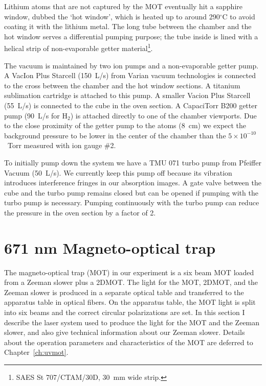 \documentclass[oneside,12pt]{memoir}
\begin{document}
Lithium atoms that are not captured by the MOT eventually hit a sapphire
window, dubbed the `hot window', which is heated up to around 290$^{\circ}$C
to avoid coating it with the lithium metal.  The long tube between the chamber
and the hot window serves a differential pumping purpose;  the tube inside is
lined with a helical strip of non-evaporable getter material\footnote{SAES St
707/CTAM/30D, 30~mm wide strip.}.

The vacuum is maintained by two ion pumps and a non-evaporable getter pump.  A
VacIon Plus Starcell (150~L/s) from Varian vacuum technologies is connected to
the cross between the chamber and the hot window sections.   A titanium
sublimation cartridge is attached to this pump.  A smaller Vacion Plus Starcell
(55~L/s) is connected to the cube in the oven section.  A CapaciTorr B200
getter pump (90~L/s for H$_{2}$) is attached directly to one of the chamber
viewports.   Due to the close proximity of the getter pump to the atoms (8~cm)
we expect the background pressure to be lower in the center of the chamber than
the $5\times10^{-10}$~Torr measured with ion gauge \#2.

To initially pump down the system we have a TMU 071 turbo pump from Pfeiffer
Vacuum (50~L/s).  We currently keep this pump off because its vibration
introduces interference fringes in our absorption images.   A gate valve
between the cube and the turbo pump remains closed but can be opened if pumping
with the turbo pump is necessary.   Pumping continuously with the turbo pump
can reduce the pressure in the oven section by a factor of 2.   


\section{671 nm Magneto-optical trap}


The magneto-optical trap (MOT) in our experiment is a six beam MOT loaded from
a Zeeman slower plus a 2DMOT.   The light for the MOT, 2DMOT, and the Zeeman
slower is produced in a separate optical table and transferred to the apparatus
table in  optical fibers.  On the apparatus table, the MOT light is split into
six beams and the correct circular polarizations are set.  In this section I
describe the laser system used to produce the light for the MOT and the Zeeman
slower, and also give technical information about our Zeeman slower.  Details
about the operation parameters and characteristics of the MOT are deferred to
Chapter~\ref{ch:uvmot}.
\end{document}
